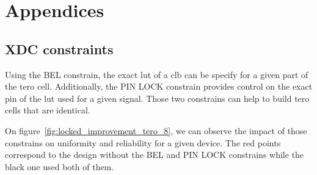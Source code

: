 \appendix
\chapter*{Appendices}
\renewcommand{\thesection}{\Alph{section}}

\section{XDC constraints}
\label{appendix:constraints}

Using the BEL constrain, the exact \acrshort{lut} of a \acrshort{clb} can be specify for a given part of the \acrshort{tero} cell. Additionally, the PIN LOCK constrain provides control on the exact pin of the \acrshort{lut} used for a given signal. Those two constrains can help to build \acrshort{tero} cells that are identical.

On figure~\ref{fig:locked_improvement_tero_8}, we can observe the impact of those constrains on uniformity and reliability for a given device. The red points correspond to the design without the BEL and PIN LOCK constrains while the black one used both of them.

